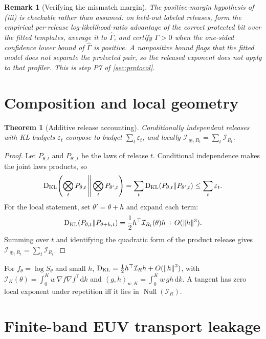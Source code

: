 \documentclass[11pt]{article}
\newtheorem{theorem}{Theorem}
\newtheorem{remark}{Remark}
\DeclareMathOperator{\KL}{D_{\rm KL}}
\DeclareMathOperator{\Null}{Null}
\newcommand{\dd}{\mathrm{d}}
\newcommand{\eps}{\varepsilon}
\newcommand{\calI}{\mathcal I}
\newcommand{\inner}[2]{\left\langle #1,#2\right\rangle}
\newcommand{\norm}[1]{\left\lVert #1\right\rVert}
\begin{document}
\begin{remark}[Verifying the mismatch margin]
The positive-margin hypothesis of (iii) is checkable rather than assumed: on held-out labeled releases, form the empirical per-release log-likelihood-ratio advantage of the correct protected bit over the fitted templates, average it to \(\widehat\Gamma\), and certify \(\Gamma>0\) when the one-sided confidence lower bound of \(\widehat\Gamma\) is positive. A nonpositive bound flags that the fitted model does not separate the protected pair, so the released exponent does not apply to that profiler. This is step P7 of \cref{sec:protocol}.
\end{remark}

\section{Composition and local geometry}

\begin{theorem}[Additive release accounting]
\label{thm:composition}
Conditionally independent releases with KL budgets \(\eps_t\) compose to budget \(\sum_t\eps_t\), and locally \(\calI_{\oplus_t R_t}=\sum_t\calI_{R_t}\).
\end{theorem}

\begin{proof}
Let \(P_{\theta,t}\) and \(P_{\theta',t}\) be the laws of release \(t\). Conditional independence makes the joint laws products, so
\[
\KL\!\left(\bigotimes_tP_{\theta,t}\,\middle\Vert\,\bigotimes_tP_{\theta',t}\right)
=\sum_t\KL(P_{\theta,t}\Vert P_{\theta',t})
\le\sum_t\eps_t .
\]
For the local statement, set \(\theta'=\theta+h\) and expand each term:
\[
\KL(P_{\theta,t}\Vert P_{\theta+h,t})
=\frac12 h^\top\calI_{R_t}(\theta)h+O(\|h\|^3).
\]
Summing over \(t\) and identifying the quadratic form of the product release gives \(\calI_{\oplus_tR_t}=\sum_t\calI_{R_t}\).
\end{proof}

For \(f_\theta=\log S_\theta\) and small \(h\), \(\KL=\tfrac12 h^\top\calI_R h+O(\norm h^3)\), with \(\calI_K(\theta)=\int_0^K w\,\nabla f\nabla f^\top\dd k\) and \(\inner{g}{h}_{w,K}=\int_0^K w\,gh\,\dd k\). A tangent has zero local exponent under repetition iff it lies in \(\Null(\calI_R)\).

\section{Finite-band EUV transport leakage}
\label{sec:transport}
\end{document}
